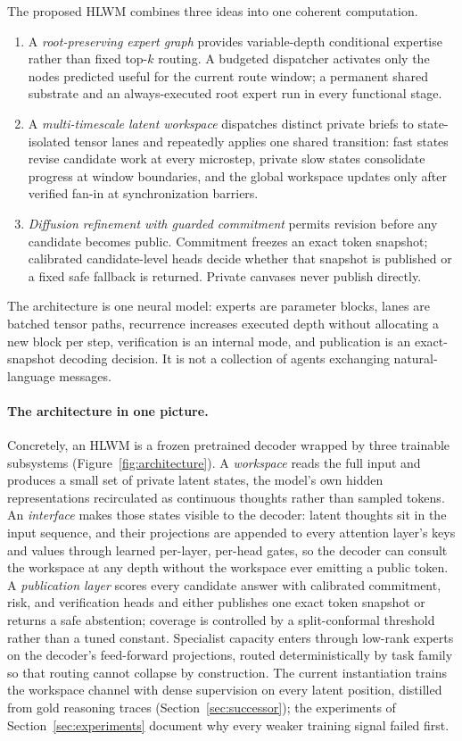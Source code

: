 \documentclass[10pt,a4paper]{article}
\begin{document}
The proposed HLWM combines three ideas into one coherent computation.
\begin{enumerate}[label=\arabic*.]
\item A \emph{root-preserving expert graph} provides variable-depth conditional
  expertise rather than fixed top-$k$ routing. A budgeted dispatcher activates
  only the nodes predicted useful for the current route window; a permanent
  shared substrate and an always-executed root expert run in every functional
  stage.
\item A \emph{multi-timescale latent workspace} dispatches distinct private
  briefs to state-isolated tensor lanes and repeatedly applies one shared
  transition: fast states revise candidate work at every microstep, private
  slow states consolidate progress at window boundaries, and the global
  workspace updates only after verified fan-in at synchronization barriers.
\item \emph{Diffusion refinement with guarded commitment} permits revision
  before any candidate becomes public. Commitment freezes an exact token
  snapshot; calibrated candidate-level heads decide whether that snapshot is
  published or a fixed safe fallback is returned. Private canvases never
  publish directly.
\end{enumerate}

The architecture is one neural model: experts are parameter blocks, lanes are
batched tensor paths, recurrence increases executed depth without allocating a
new block per step, verification is an internal mode, and publication is an
exact-snapshot decoding decision. It is not a collection of agents exchanging
natural-language messages.

\paragraph{The architecture in one picture.}
Concretely, an HLWM is a frozen pretrained decoder wrapped by three trainable
subsystems (Figure~\ref{fig:architecture}). A \emph{workspace} reads the
full input and produces a small set of private latent states, the model's
own hidden representations recirculated as continuous thoughts rather than
sampled tokens. An \emph{interface} makes those states visible to the
decoder: latent thoughts sit in the input sequence, and their projections
are appended to every attention layer's keys and values through learned
per-layer, per-head gates, so the decoder can consult the workspace at any
depth without the workspace ever emitting a public token. A
\emph{publication layer} scores every candidate answer with calibrated
commitment, risk, and verification heads and either publishes one exact
token snapshot or returns a safe abstention; coverage is controlled by a
split-conformal threshold rather than a tuned constant. Specialist capacity
enters through low-rank experts on the decoder's feed-forward projections,
routed deterministically by task family so that routing cannot collapse by
construction. The current instantiation trains the workspace channel with
dense supervision on every latent position, distilled from gold reasoning
traces (Section~\ref{sec:successor}); the experiments of
Section~\ref{sec:experiments} document why every weaker training signal
failed first.
\end{document}
